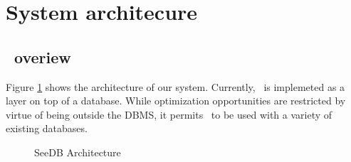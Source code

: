 \section{System architecure}
\label{sec:system_architecture}

\subsection{\SeeDB\ overiew}
\label{subsec:overview}

Figure \ref{fig:sys-arch} shows the architecture of our system. Currently,
\SeeDB\ is implemeted as a layer on top of a database. While optimization opportunities are
restricted by virtue of being outside the DBMS, it permits \SeeDB\ to be used 
with a variety of existing databases.

\begin{figure}[htb]
\centerline{
\hbox{}}
\caption{SeeDB Architecture}
\label{fig:sys-arch}
\end{figure} 

